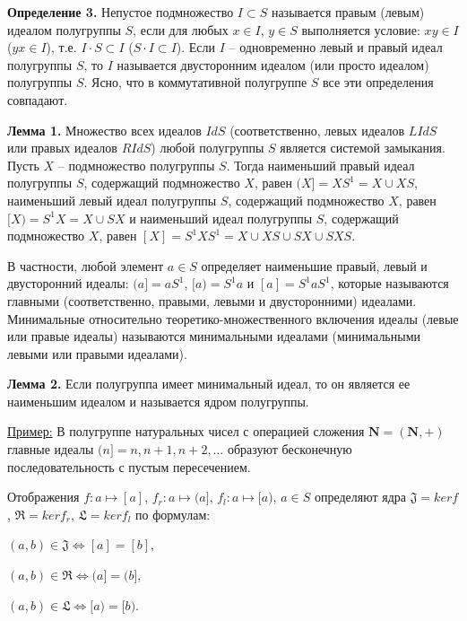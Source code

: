 \documentclass[bachelor, och, labwork]{shiza}
\begin{document}
    \textbf{Определение 3.} Непустое подмножество $I \subset S$ называется правым (левым) идеалом полугруппы $S$,
    если для любых $x \in I$, $y \in S$ выполняется условие: $xy \in I$ ($yx \in I$), т.е. $I \cdot S \subset I$ ($S \cdot I \subset I$).
    Если $I$ -- одновременно левый и правый идеал полугруппы $S$, то $I$ называется двусторонним идеалом (или просто идеалом) полугруппы
    $S$. Ясно, что в коммутативной полугруппе $S$ все эти определения совпадают.

    \textbf{Лемма 1.} Множество всех идеалов $Id S$  (соответственно, левых идеалов $LId S$  или правых идеалов $RId S$) любой
    полугруппы $S$ является системой замыкания. Пусть $X$ -- подмножество полугруппы $S$. Тогда наименьший правый идеал 
    полугруппы $S$, содержащий подмножество $X$, равен $(X] = XS^1 = X \cup XS$, наименьший левый идеал полугруппы $S$, содержащий
    подмножество $X$, равен $[X) = S^1X = X \cup SX$  и наименьший идеал полугруппы $S$, содержащий подмножество $X$, равен 
    $[X] = S^1XS^1 = X \cup XS \cup SX \cup SXS$.
    
    В частности, любой элемент $a \in S$ определяет наименьшие правый, левый и двусторонний идеалы: $(a] = aS^1$, $[a) = S^1a$ и
    $[a] = S^1aS^1$, которые называются главными (соответственно, правыми, левыми и двусторонними) идеалами.
    Минимальные относительно теоретико-множественного включения идеалы (левые или правые идеалы) называются минимальными идеалами
    (минимальными левыми или правыми идеалами).
    
    \textbf{Лемма 2.} Если полугруппа имеет минимальный идеал, то он является ее наименьшим идеалом и называется ядром полугруппы.

    \underline{Пример:} В полугруппе натуральных чисел с операцией сложения $\textbf{N} = (\textbf{N}, +)$ главные идеалы 
    $(n] = {n, n + 1, n + 2, \dots}$ образуют бесконечную последовательность с пустым пересечением.

    \begin{center}
      Отображения $f: a \mapsto [a]$, $f_r: a \mapsto (a]$, $f_l: a \mapsto [a)$, $a \in S$ определяют ядра $\mathfrak{J} = ker f$,
      $\mathfrak{R} = ker f_r$, $\mathfrak{L} = ker f_l$ по формулам:

      $(a, b) \in \mathfrak{J} \Longleftrightarrow [a] = [b]$,

      $(a, b) \in \mathfrak{R} \Longleftrightarrow (a] = (b]$,

      $(a, b) \in \mathfrak{L} \Longleftrightarrow [a) = [b)$.
    \end{center}
\end{document}
